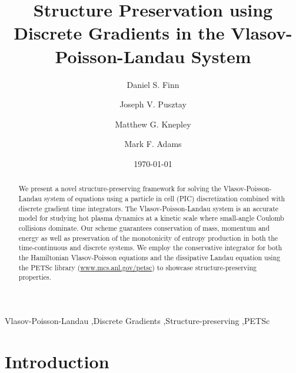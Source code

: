 \documentclass[preprint,12pt]{elsarticle}
\theoremstyle{definition}
\begin{document}
\begin{frontmatter}

\title{Structure Preservation using Discrete Gradients in the Vlasov-Poisson-Landau System}
\date{\today}
\author[1]{Daniel S. Finn}
\author[2]{Joseph V. Pusztay}
\author[2]{Matthew G. Knepley}
\author[3]{Mark F. Adams}
\begin{abstract}
We present a novel structure-preserving framework for solving the Vlasov-Poisson-Landau system of equations using a particle in cell (PIC) discretization combined with discrete gradient time integrators. The Vlasov-Poisson-Landau system is an accurate model for studying hot plasma dynamics at a kinetic scale where small-angle Coulomb collisions dominate. Our scheme guarantees conservation of mass, momentum and energy as well as preservation of the monotonicity of entropy production in both the time-continuous and discrete systems. We employ the conservative integrator for both the Hamiltonian Vlasov-Poisson equations and the dissipative Landau equation using the PETSc library (\url{www.mcs.anl.gov/petsc}) to showcase structure-preserving properties.
\end{abstract}

\begin{keyword}
Vlasov-Poisson-Landau \sep Discrete Gradients \sep Structure-preserving \sep PETSc



\end{keyword}

\end{frontmatter}
\newpage



\section{Introduction}\label{sec:Introduction}
\end{document}
